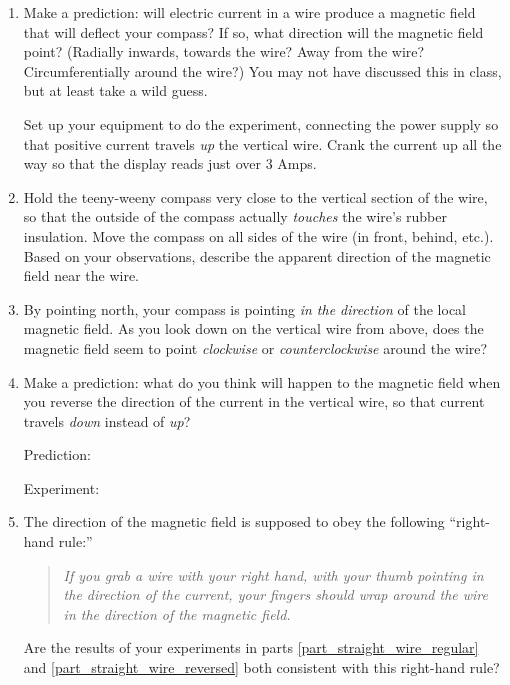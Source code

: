 \begin{enumerate}[labparts]

\item Make a prediction: will electric current in a wire produce a magnetic field that will deflect your compass?  If so, what direction will the magnetic field point?  (Radially inwards, towards the wire?  Away from the wire?  Circumferentially around the wire?)  You may not have discussed this in class, but at least take a wild guess.
\answerspace{0.5 in}

Set up your equipment to do the experiment, connecting the power supply so that positive current travels \textit{up} the vertical wire.  Crank the current up all the way so that the display reads just over 3 Amps.  

\item Hold the teeny-weeny compass very close to the vertical section of the wire, so that the outside of the compass  actually \textit{touches} the wire's rubber insulation.  Move the compass on all sides of the wire (in front, behind, etc.).  Based on your observations, describe the apparent direction of the magnetic field near the wire. \label{part_straight_wire_regular}
\answerspace{0.5 in}

\item By pointing north, your compass is pointing \textit{in the direction} of the local magnetic field.  As you look down on the vertical wire from above, does the magnetic field seem to point \textit{clockwise} or \textit{counterclockwise} around the wire? 
\answerspace{0.3 in}

\item Make a prediction: what do you think will happen to the magnetic field when you reverse the direction of the current in the vertical wire, so that current travels \textit{down} instead of \textit{up}? \label{part_straight_wire_reversed}

\bigskip
\hspace{0.5in} Prediction:

\bigskip
\hspace{0.5in} Experiment:
\bigskip

\item The direction of the magnetic field is supposed to obey the following ``right-hand rule:''
\begin{quote}\textit{If you grab a wire with your right hand, with your thumb pointing in the direction of the current, your fingers should wrap around the wire in the direction of the magnetic field.}
\end{quote}
Are the results of your experiments in parts \ref{part_straight_wire_regular} and \ref{part_straight_wire_reversed} both consistent with this right-hand rule?
\answerspace{0.3 in}

\end{enumerate}

